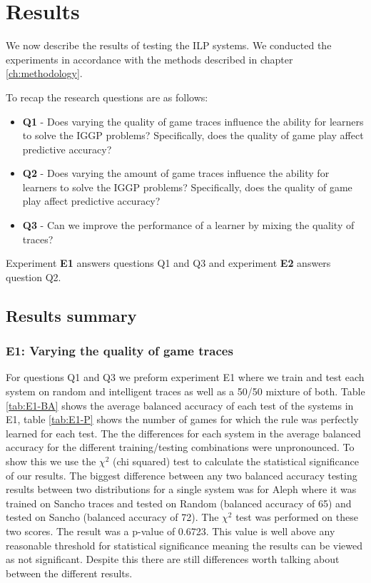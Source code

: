 \chapter{Results}\label{ch:results}
We now describe the results of testing the ILP systems. We conducted the experiments in accordance with the methods described in chapter \ref{ch:methodology}.

To recap the research questions are as follows:
\begin{itemize}
	\item \textbf{Q1} - Does varying the quality of game traces influence the ability for learners to solve the IGGP problems? Specifically, does the quality of game play affect predictive accuracy?
	\item \textbf{Q2} - Does varying the amount of game traces influence the ability for learners to solve the IGGP problems? Specifically, does the quality of game play affect predictive accuracy?
	\item \textbf{Q3} - Can we improve the performance of a learner by mixing the quality of traces?
\end{itemize}

Experiment \textbf{E1} answers questions Q1 and Q3 and experiment \textbf{E2} answers question Q2.

\section{Results summary}



\subsection{E1: Varying the quality of game traces}
For questions Q1 and Q3 we preform experiment E1 where we train and test each system on random and intelligent traces as well as a 50/50 mixture of both. Table \ref{tab:E1-BA} shows the average balanced accuracy of each test of the systems in E1, table \ref{tab:E1-P} shows the number of games for which the rule was perfectly learned for each test. The the differences for each system in the average balanced accuracy for the different training/testing combinations were unpronounced. To show this we use the $\chi^2$ (chi squared) test to calculate the statistical significance of our results. The biggest difference between any two balanced accuracy testing results between two distributions for a single system was for Aleph where it was trained on Sancho traces and tested on Random (balanced accuracy of 65) and tested on Sancho (balanced accuracy of 72). The $\chi^2$ test was performed on these two scores. The result was a p-value of 0.6723. This value is well above any reasonable threshold for statistical significance meaning the results can be viewed as not significant. Despite this there are still differences worth talking about between the different results.

